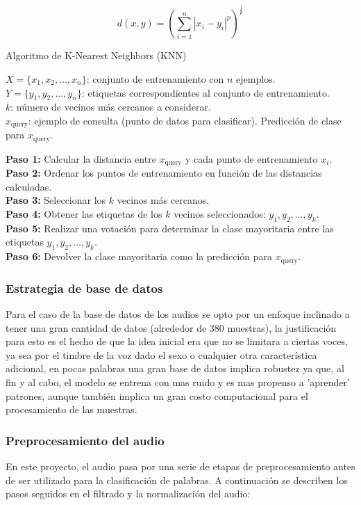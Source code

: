 \documentclass[12pt,a4paper]{article}
\begin{document}
\[
d(x, y) = \left( \sum_{i=1}^{n} |x_i - y_i|^p \right)^{\frac{1}{p}}
\]
\begin{algorithm}
\caption{Algoritmo de K-Nearest Neighbors (KNN)}
\begin{algorithmic}[1]
\Require $X = \{x_1, x_2, \dots, x_n\}$: conjunto de entrenamiento con $n$ ejemplos.\\
\Require $Y = \{y_1, y_2, \dots, y_n\}$: etiquetas correspondientes al conjunto de entrenamiento.\\
\Require $k$: número de vecinos más cercanos a considerar.\\
\Require $x_{\text{query}}$: ejemplo de consulta (punto de datos para clasificar).
\Ensure Predicción de clase para $x_{\text{query}}$.

\State \textbf{Paso 1:} Calcular la distancia entre $x_{\text{query}}$ y cada punto de entrenamiento $x_i$.\\
\State \textbf{Paso 2:} Ordenar los puntos de entrenamiento en función de las distancias calculadas.\\
\State \textbf{Paso 3:} Seleccionar los $k$ vecinos más cercanos.\\
\State \textbf{Paso 4:} Obtener las etiquetas de los $k$ vecinos seleccionados: $y_1, y_2, \dots, y_k$.\\
\State \textbf{Paso 5:} Realizar una votación para determinar la clase mayoritaria entre las etiquetas $y_1, y_2, \dots, y_k$.\\
\State \textbf{Paso 6:} Devolver la clase mayoritaria como la predicción para $x_{\text{query}}$.
\end{algorithmic}
\end{algorithm}
\newpage
\subsubsection*{Estrategia de base de datos}
Para el caso de la base de datos de los audios se opto por un enfoque inclinado a tener una gran cantidad de datos (alrededor de 380 muestras), la justificación  para esto es el hecho de que la idea inicial era que no se limitara a ciertas voces, ya sea por el timbre de la voz dado el sexo o cualquier otra característica adicional, en pocas palabras una gran base de datos implica robustez ya que, al fin y al cabo, el modelo se entrena con mas ruido y es mas propenso a 'aprender' patrones, aunque también implica un gran costo computacional para el procesamiento de las muestras.

\subsubsection*{Preprocesamiento del audio}
En este proyecto, el audio pasa por una serie de etapas de preprocesamiento antes de ser utilizado para la clasificación de palabras. A continuación se describen los pasos seguidos en el filtrado y la normalización del audio:
\end{document}
